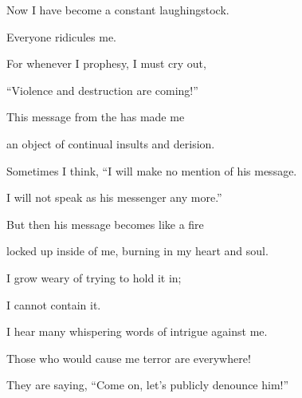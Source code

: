 {\par }{\Q Now I have become
a constant laughingstock.
\par }{\Q Everyone
ridicules me.
\par }{\Q {}For
whenever
I prophesy,
I must cry out,
\par }{\Q “Violence
and destruction
are coming!”

\par }{\Q This
message
from the
{}
has made
me
\par }{\Q an object of
continual insults
and derision.
\par }{\Q {}Sometimes I think,
“I will make no
mention
of his message.
\par }{\Q I will not
speak
as his messenger any more.”
\par }{\Q But then
his message becomes
like a fire
\par }{\Q locked up inside
of me, burning
in my heart
and soul.
\par }{\Q I grow weary
of trying
to hold it in;
\par }{\Q I cannot
contain it.
\par }{\Q {}I hear
many
whispering words of intrigue against
me.
\par }{\Q Those who would cause me terror
are everywhere!

\par }{\Q They are saying, “Come on, let’s publicly
denounce
him!”

}
